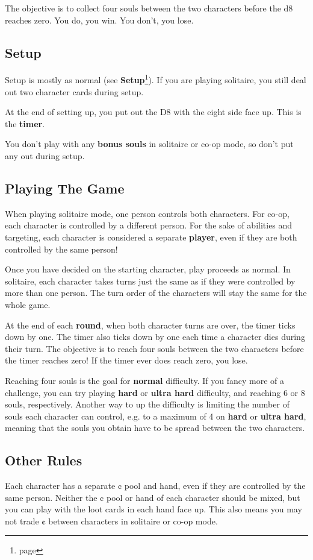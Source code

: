 \documentclass[10pt, a4paper, twoside]{article} %
\begin{document}
    The objective is to collect four souls between the two characters before the d8 reaches zero. You do, you win. You don’t, you lose.
    \subsection{Setup}
    Setup is mostly as normal (see \textbf{Setup}\footnote{page \pageref{setup}}). If you are playing solitaire, you still deal out two character cards during setup.

    At the end of setting up, you put out the D8 with the eight side face up. This is the \textbf{timer}.

    You don’t play with any \textbf{bonus souls} in solitaire or co-op mode, so don’t put any out during setup.
    \subsection{Playing The Game}
    When playing solitaire mode, one person controls both characters. For co-op, each character is controlled by a different person. For the sake of abilities and targeting, each character is considered a separate \textbf{player}, even if they are both controlled by the same person!

    Once you have decided on the starting character, play proceeds as normal. In solitaire, each character takes turns just the same as if they were controlled by more than one person. The turn order of the characters will stay the same for the whole game.

    At the end of each \textbf{round}, when both character turns are over, the timer ticks down by one. The timer also ticks down by one each time a character dies during their turn. The objective is to reach four souls between the two characters before the timer reaches zero! If the timer ever does reach zero, you lose.

    Reaching four souls is the goal for \textbf{normal} difficulty. If you fancy more of a challenge, you can try playing \textbf{hard} or \textbf{ultra hard} difficulty, and reaching 6 or 8 souls, respectively. Another way to up the difficulty is limiting the number of souls each character can control, e.g. to a maximum of 4 on \textbf{hard} or \textbf{ultra hard}, meaning that the souls you obtain have to be spread between the two characters.
    \subsection{Other Rules}
    Each character has a separate ¢ pool and hand, even if they are controlled by the same person. Neither the ¢ pool or hand of each character should be mixed, but you can play with the loot cards in each hand face up. This also means you may not trade ¢ between characters in solitaire or co-op mode.
\end{document}
